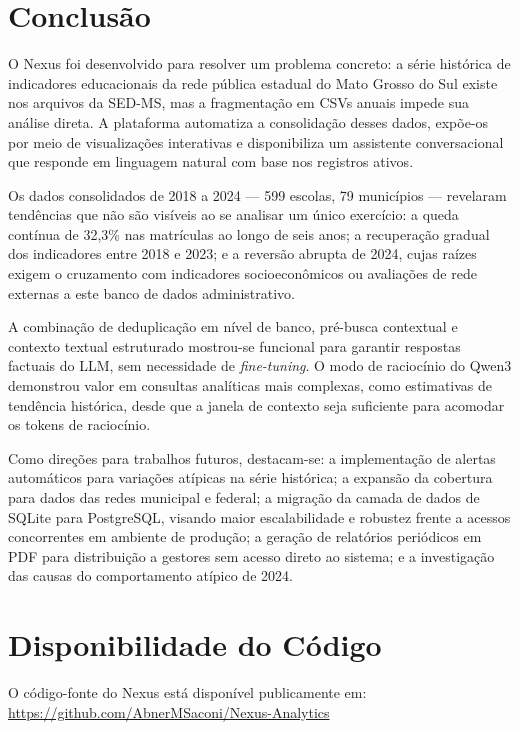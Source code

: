 \documentclass[preprint,10pt,5p]{elsarticle}
\begin{document}
\section{Conclusão}
\label{conclusion}

O Nexus foi desenvolvido para resolver um problema concreto: a série histórica de
indicadores educacionais da rede pública estadual do Mato Grosso do Sul existe nos arquivos
da SED-MS, mas a fragmentação em CSVs anuais impede sua análise direta. A plataforma
automatiza a consolidação desses dados, expõe-os por meio de visualizações interativas e
disponibiliza um assistente conversacional que responde em linguagem natural com base nos
registros ativos.

Os dados consolidados de 2018 a 2024 — 599 escolas, 79 municípios — revelaram tendências
que não são visíveis ao se analisar um único exercício: a queda contínua de 32,3\% nas
matrículas ao longo de seis anos; a recuperação gradual dos indicadores entre 2018 e 2023;
e a reversão abrupta de 2024, cujas raízes exigem o cruzamento com indicadores
socioeconômicos ou avaliações de rede externas a este banco de dados administrativo.

A combinação de deduplicação em nível de banco, pré-busca contextual e contexto textual
estruturado mostrou-se funcional para garantir respostas factuais do LLM, sem necessidade
de \textit{fine-tuning}. O modo de raciocínio do Qwen3 demonstrou valor em consultas
analíticas mais complexas, como estimativas de tendência histórica, desde que a janela de
contexto seja suficiente para acomodar os tokens de raciocínio.

Como direções para trabalhos futuros, destacam-se: a implementação de alertas automáticos
para variações atípicas na série histórica; a expansão da cobertura para dados das redes
municipal e federal; a migração da camada de dados de SQLite para PostgreSQL, visando maior
escalabilidade e robustez frente a acessos concorrentes em ambiente de produção; a geração
de relatórios periódicos em PDF para distribuição a gestores sem acesso direto ao sistema;
e a investigação das causas do comportamento atípico de 2024.

\section*{Disponibilidade do Código}

O código-fonte do Nexus está disponível publicamente em:
\url{https://github.com/AbnerMSaconi/Nexus-Analytics}



\end{document}
